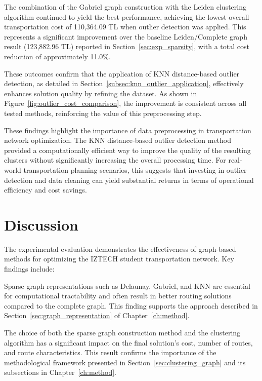 The combination of the Gabriel graph construction with the Leiden clustering algorithm continued to yield the best performance, achieving the lowest overall transportation cost of 110,364.09 TL when outlier detection was applied. This represents a significant improvement over the baseline Leiden/Complete graph result (123,882.96 TL) reported in Section~\ref{sec:exp_sparsity}, with a total cost reduction of approximately 11.0\%.

These outcomes confirm that the application of KNN distance-based outlier detection, as detailed in Section~\ref{subsec:knn_outlier_application}, effectively enhances solution quality by refining the dataset. As shown in Figure~\ref{fig:outlier_cost_comparison}, the improvement is consistent across all tested methods, reinforcing the value of this preprocessing step.

These findings highlight the importance of data preprocessing in transportation network optimization. The KNN distance-based outlier detection method provided a computationally efficient way to improve the quality of the resulting clusters without significantly increasing the overall processing time. For real-world transportation planning scenarios, this suggests that investing in outlier detection and data cleaning can yield substantial returns in terms of operational efficiency and cost savings.

\section{Discussion}
\label{sec:discussion}

The experimental evaluation demonstrates the effectiveness of graph-based methods for optimizing the IZTECH student transportation network. Key findings include:

Sparse graph representations such as Delaunay, Gabriel, and KNN are essential for computational tractability and often result in better routing solutions compared to the complete graph. This finding supports the approach described in Section~\ref{sec:graph_representation} of Chapter~\ref{ch:method}.

The choice of both the sparse graph construction method and the clustering algorithm has a significant impact on the final solution's cost, number of routes, and route characteristics. This result confirms the importance of the methodological framework presented in Section~\ref{sec:clustering_graph} and its subsections in Chapter~\ref{ch:method}.

